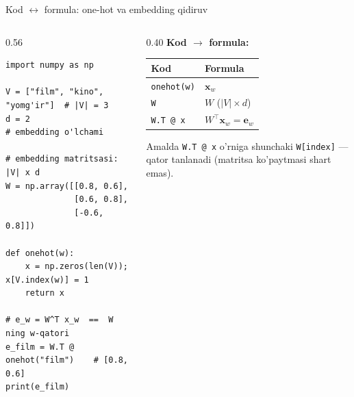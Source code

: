 \documentclass[aspectratio=169,11pt]{beamer}
\begin{document}
\begin{frame}[fragile]{Kod $\leftrightarrow$ formula: one-hot va embedding qidiruv}
  \begin{columns}[T]
    \begin{column}{0.56\textwidth}
\begin{lstlisting}
import numpy as np

V = ["film", "kino", "yomg'ir"]  # |V| = 3
d = 2                            # embedding o'lchami

# embedding matritsasi: |V| x d
W = np.array([[0.8, 0.6],
              [0.6, 0.8],
              [-0.6, 0.8]])

def onehot(w):
    x = np.zeros(len(V)); x[V.index(w)] = 1
    return x

# e_w = W^T x_w  ==  W ning w-qatori
e_film = W.T @ onehot("film")    # [0.8, 0.6]
print(e_film)
\end{lstlisting}
    \end{column}
    \begin{column}{0.40\textwidth}
      \textbf{Kod $\to$ formula:}\\[3pt]
      \footnotesize
      \begin{tabular}{p{2.0cm}p{2.0cm}}
        \toprule
        Kod & Formula \\
        \midrule
        \texttt{onehot(w)} & $\mathbf{x}_w$ \\
        \texttt{W} & $W$ ($|V|{\times}d$) \\
        \texttt{W.T @ x} & $W^\top\mathbf{x}_w=\mathbf{e}_w$ \\
        \bottomrule
      \end{tabular}
      \vspace{4pt}
      \begin{tcolorbox}[okbox,top=2pt,bottom=2pt]
        \footnotesize
        Amalda \texttt{W.T @ x} o'rniga shunchaki \texttt{W[index]} --- qator
        tanlanadi (matritsa ko'paytmasi shart emas).
      \end{tcolorbox}
    \end{column}
  \end{columns}
\end{frame}
\end{document}
